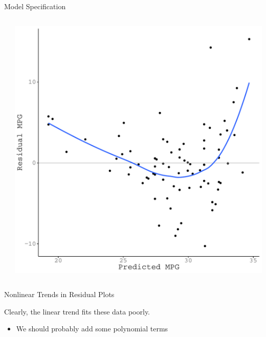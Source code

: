 \documentclass[10pt]{beamer}\usepackage[]{graphicx}\usepackage[]{color}
\makeatletter
\def\maxwidth{ %
  \ifdim\Gin@nat@width>\linewidth
    \linewidth
  \else
    \Gin@nat@width
  \fi
}
\newenvironment{knitrout}{}{} %
\makeatother
\begin{document}
{\begin{frame}{Model Specification}
\begin{columns}
\begin{column}{0.5\textwidth}
\begin{knitrout}
{}


\end{knitrout}

\end{column}

\begin{column}{0.5\textwidth}

\begin{knitrout}\footnotesize
{}\color{fgcolor}

{\centering \includegraphics[width=\maxwidth]{figure/assumptions-unnamed-chunk-12-1} 

}


\end{knitrout}

\end{column}
\end{columns}

\end{frame}


\begin{frame}{Nonlinear Trends in Residual Plots}

  Clearly, the linear trend fits these data poorly.
  \begin{itemize}
    \item We should probably add some polynomial terms
  \end{itemize}
  \vb
  \begin{columns}
    \begin{column}{0.5\textwidth}


\end{column}
\end{columns}
\end{frame}}
\end{document}
